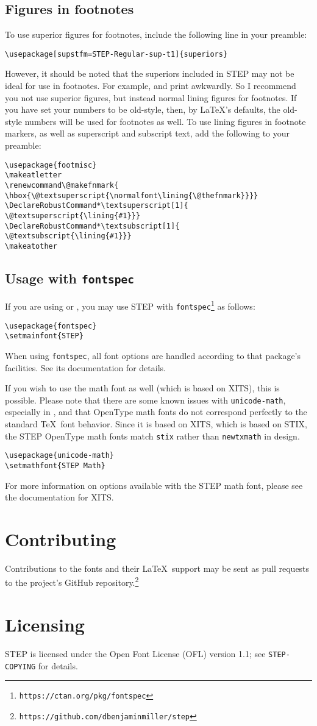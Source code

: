 \documentclass[12pt]{article}
\makeatletter
\renewcommand\@makefnmark{\hbox{\@textsuperscript{\normalfont\lining{\@thefnmark}}}}
\DeclareRobustCommand*\textsuperscript[1]{\@textsuperscript{\lining{#1}}}
\DeclareRobustCommand*\textsubscript[1]{\@textsubscript{\lining{#1}}}
\makeatother
\begin{document}
\subsection{Figures in footnotes}
To use superior figures for footnotes, include the following line in your preamble:
\begin{verbatim}
\usepackage[supstfm=STEP-Regular-sup-t1]{superiors}
\end{verbatim}
However, it should be noted that the superiors included in STEP may not be ideal for use in footnotes. For example,  and  print awkwardly. So I recommend you not use superior figures, but instead normal lining figures for footnotes. If you have set your numbers to be old-style, then, by \LaTeX's defaults, the old-style numbers will be used for footnotes as well. To use lining figures in footnote markers, as well as superscript and subscript text, add the following to your preamble:
\begin{verbatim}
\usepackage{footmisc}
\makeatletter
\renewcommand\@makefnmark{
\hbox{\@textsuperscript{\normalfont\lining{\@thefnmark}}}}
\DeclareRobustCommand*\textsuperscript[1]{
\@textsuperscript{\lining{#1}}}
\DeclareRobustCommand*\textsubscript[1]{
\@textsubscript{\lining{#1}}}
\makeatother
\end{verbatim}
\subsection{Usage with \texttt{fontspec}}
If you are using  or , you may use STEP with \texttt{fontspec}\footnote{\texttt{https://ctan.org/pkg/fontspec}} as follows:
\begin{verbatim}
\usepackage{fontspec}
\setmainfont{STEP}
\end{verbatim}
When using \texttt{fontspec}, all font options are handled according to that package's facilities. See its documentation for details.

If you wish to use the math font as well (which is based on XITS), this is possible. Please note that there are some known issues with \texttt{unicode-math}, especially in , and that OpenType math fonts do not correspond perfectly to the standard \TeX\ font behavior. Since it is based on XITS, which is based on STIX, the STEP OpenType math fonts match \texttt{stix} rather than \texttt{newtxmath} in design.
\begin{verbatim}
\usepackage{unicode-math}
\setmathfont{STEP Math}
\end{verbatim}
For more information on options available with the STEP math font, please see the documentation for XITS.
\section{Contributing}
Contributions to the fonts and their \LaTeX\ support may be sent as pull requests to the project's GitHub repository.\footnote{\texttt{https://github.com/dbenjaminmiller/step}}
\section{Licensing}
STEP is licensed under the Open Font License (OFL) version 1.1; see \texttt{STEP-COPYING} for details.
\end{document}
